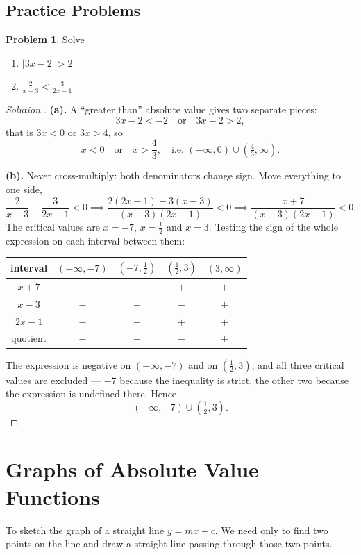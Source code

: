 \documentclass[11pt,a4paper]{article}
\theoremstyle{definition}
\newtheorem{problemx}{Problem}[section]
\newenvironment{problem}{\begin{problemx}}{\end{problemx}}
\newenvironment{solution}
  {\renewcommand{\qedsymbol}{}\begin{proof}[\textit{Solution}.]}
  {\end{proof}}
\begin{document}
\subsection{Practice Problems}

\begin{problem}
Solve
\begin{enumerate}
\item[(a).] $\left|3x-2\right|>2$
\item[(b).] $\frac{2}{x-3}<\frac{3}{2x-1}$
\end{enumerate}
\end{problem}

\begin{solution}
\textbf{(a).} A ``greater than'' absolute value gives two separate pieces:
$$3x-2<-2 \quad \text{or}\quad  3x-2>2,$$
that is $3x<0$ or $3x>4$, so
$$x<0 \quad \text{or}\quad  x>\frac{4}{3},
\quad \text{i.e. } (-\infty,0)\cup\left(\tfrac{4}{3},\infty\right).$$

\textbf{(b).} Never cross-multiply: both denominators change sign. Move everything
to one side,
$$\frac{2}{x-3}-\frac{3}{2x-1}<0
\implies \frac{2(2x-1)-3(x-3)}{(x-3)(2x-1)}<0
\implies \frac{x+7}{(x-3)(2x-1)}<0 .$$
The critical values are $x=-7$, $x=\frac{1}{2}$ and $x=3$. Testing the sign of the
whole expression on each interval between them:

\begin{table}[H]
\centering
\begin{tabular}{c|cccc}
interval & $(-\infty,-7)$ & $\left(-7,\tfrac{1}{2}\right)$ & $\left(\tfrac{1}{2},3\right)$ & $(3,\infty)$\\
\hline
$x+7$ & $-$ & $+$ & $+$ & $+$\\
$x-3$ & $-$ & $-$ & $-$ & $+$\\
$2x-1$ & $-$ & $-$ & $+$ & $+$\\
\hline
quotient & $-$ & $+$ & $-$ & $+$\\
\end{tabular}
\end{table}

The expression is negative on $(-\infty,-7)$ and on $\left(\frac{1}{2},3\right)$,
and all three critical values are excluded --- $-7$ because the inequality is
strict, the other two because the expression is undefined there. Hence
$$(-\infty,-7)\cup\left(\tfrac{1}{2},3\right).$$
\end{solution}

\pagebreak
\section{Graphs of Absolute Value Functions}
To sketch the graph of a straight line $y=mx+c$. We need only to find two points on the line and draw a straight line passing through those two points.\\
\end{document}
